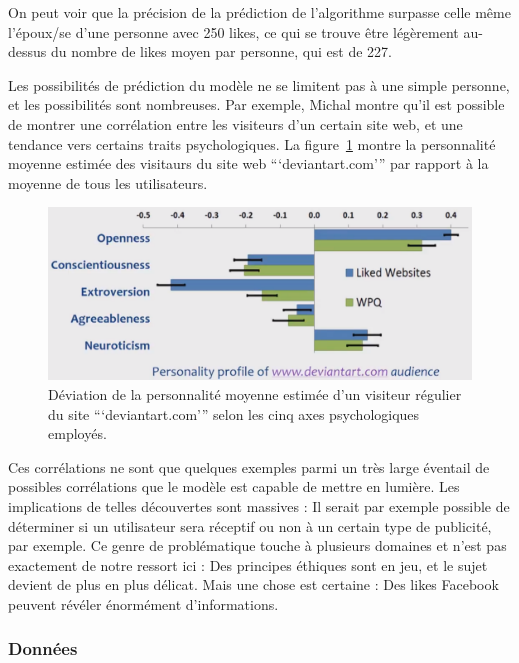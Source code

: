 			On peut voir que la précision de la prédiction de l'algorithme surpasse celle même l'époux/se d'une personne avec 250 likes, ce qui se trouve être légèrement au-dessus du nombre de likes moyen par personne, qui est de 227.

			Les possibilités de prédiction du modèle ne se limitent pas à une simple personne, et les possibilités sont nombreuses. Par exemple, Michal montre qu'il est possible de montrer une corrélation entre les visiteurs d'un certain site web, et une tendance vers certains traits psychologiques. La figure~\ref{a-talk2} montre la personnalité moyenne estimée des visitaurs du site web ```deviantart.com''' par rapport à la moyenne de tous les utilisateurs.

			\begin{figure}[ht]
				\centering
				\includegraphics[width=1\textwidth]{images/analysis/talk2}
				\caption{Déviation de la personnalité moyenne estimée d'un visiteur régulier du site ```deviantart.com''' selon les cinq axes psychologiques employés\cite{kosinski-talk}.}
				\label{a-talk2}
			\end{figure}

			Ces corrélations ne sont que quelques exemples parmi un très large éventail de possibles corrélations que le modèle est capable de mettre en lumière. Les implications de telles découvertes sont massives : Il serait par exemple possible de déterminer si un utilisateur sera réceptif ou non à un certain type de publicité, par exemple. Ce genre de problématique touche à plusieurs domaines et n'est pas exactement de notre ressort ici : Des principes éthiques sont en jeu, et le sujet devient de plus en plus délicat. Mais une chose est certaine : Des likes Facebook peuvent révéler énormément d'informations.

		\subsubsection{Données}

